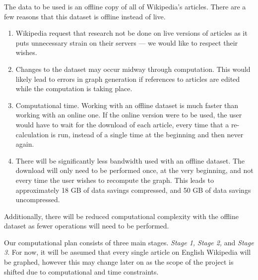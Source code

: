 \documentclass[fontsize=12pt]{article}
\begin{document}
\begin{multicols}{2}
    The data to be used is an offline copy of all of Wikipedia's articles.
    There are a few reasons that this dataset is offline instead of live.
    \begin{enumerate}
        \item Wikipedia request that research not be done on live versions of articles as it puts unnecessary strain on their servers --- we would like to respect their wishes.
        \item Changes to the dataset may occur midway through computation.
        This would likely lead to errors in graph generation if references to articles are edited while the computation is taking place.
        \item Computational time.
        Working with an offline dataset is much faster than working with an online one.
        If the online version were to be used, the user would have to wait for the download of each article, every time that a re-calculation is run, instead of a single time at the beginning and then never again.
        \item There will be significantly less bandwidth used with an offline dataset.
        The download will only need to be performed once, at the very beginning, and not every time the user wishes to recompute the graph.
        This leads to approximately 18 GB of data savings compressed, and 50 GB of data savings uncompressed.
    \end{enumerate}
    Additionally, there will be reduced computational complexity with the offline dataset as fewer operations will need to be performed.

    Our computational plan consists of three main stages.
    \textit{Stage 1, Stage 2,} and \textit{Stage 3}.
    For now, it will be assumed that every single article on English Wikipedia will be graphed, however this may change later on as the scope of the project is shifted due to computational and time constraints.


\end{multicols}
\end{document}
